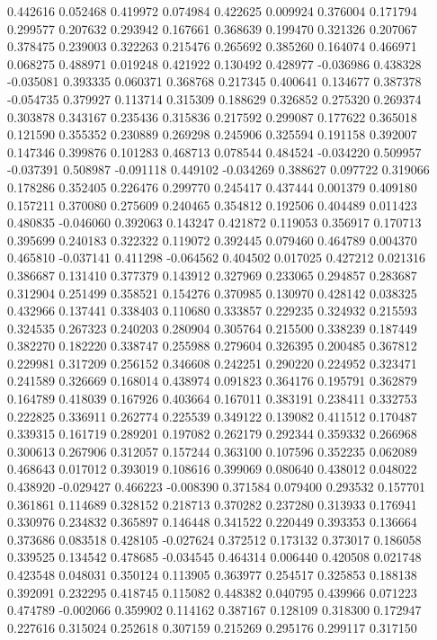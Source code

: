 0.442616
0.052468
0.419972
0.074984
0.422625
0.009924
0.376004
0.171794
0.299577
0.207632
0.293942
0.167661
0.368639
0.199470
0.321326
0.207067
0.378475
0.239003
0.322263
0.215476
0.265692
0.385260
0.164074
0.466971
0.068275
0.488971
0.019248
0.421922
0.130492
0.428977
-0.036986
0.438328
-0.035081
0.393335
0.060371
0.368768
0.217345
0.400641
0.134677
0.387378
-0.054735
0.379927
0.113714
0.315309
0.188629
0.326852
0.275320
0.269374
0.303878
0.343167
0.235436
0.315836
0.217592
0.299087
0.177622
0.365018
0.121590
0.355352
0.230889
0.269298
0.245906
0.325594
0.191158
0.392007
0.147346
0.399876
0.101283
0.468713
0.078544
0.484524
-0.034220
0.509957
-0.037391
0.508987
-0.091118
0.449102
-0.034269
0.388627
0.097722
0.319066
0.178286
0.352405
0.226476
0.299770
0.245417
0.437444
0.001379
0.409180
0.157211
0.370080
0.275609
0.240465
0.354812
0.192506
0.404489
0.011423
0.480835
-0.046060
0.392063
0.143247
0.421872
0.119053
0.356917
0.170713
0.395699
0.240183
0.322322
0.119072
0.392445
0.079460
0.464789
0.004370
0.465810
-0.037141
0.411298
-0.064562
0.404502
0.017025
0.427212
0.021316
0.386687
0.131410
0.377379
0.143912
0.327969
0.233065
0.294857
0.283687
0.312904
0.251499
0.358521
0.154276
0.370985
0.130970
0.428142
0.038325
0.432966
0.137441
0.338403
0.110680
0.333857
0.229235
0.324932
0.215593
0.324535
0.267323
0.240203
0.280904
0.305764
0.215500
0.338239
0.187449
0.382270
0.182220
0.338747
0.255988
0.279604
0.326395
0.200485
0.367812
0.229981
0.317209
0.256152
0.346608
0.242251
0.290220
0.224952
0.323471
0.241589
0.326669
0.168014
0.438974
0.091823
0.364176
0.195791
0.362879
0.164789
0.418039
0.167926
0.403664
0.167011
0.383191
0.238411
0.332753
0.222825
0.336911
0.262774
0.225539
0.349122
0.139082
0.411512
0.170487
0.339315
0.161719
0.289201
0.197082
0.262179
0.292344
0.359332
0.266968
0.300613
0.267906
0.312057
0.157244
0.363100
0.107596
0.352235
0.062089
0.468643
0.017012
0.393019
0.108616
0.399069
0.080640
0.438012
0.048022
0.438920
-0.029427
0.466223
-0.008390
0.371584
0.079400
0.293532
0.157701
0.361861
0.114689
0.328152
0.218713
0.370282
0.237280
0.313933
0.176941
0.330976
0.234832
0.365897
0.146448
0.341522
0.220449
0.393353
0.136664
0.373686
0.083518
0.428105
-0.027624
0.372512
0.173132
0.373017
0.186058
0.339525
0.134542
0.478685
-0.034545
0.464314
0.006440
0.420508
0.021748
0.423548
0.048031
0.350124
0.113905
0.363977
0.254517
0.325853
0.188138
0.392091
0.232295
0.418745
0.115082
0.448382
0.040795
0.439966
0.071223
0.474789
-0.002066
0.359902
0.114162
0.387167
0.128109
0.318300
0.172947
0.227616
0.315024
0.252618
0.307159
0.215269
0.295176
0.299117
0.317150
